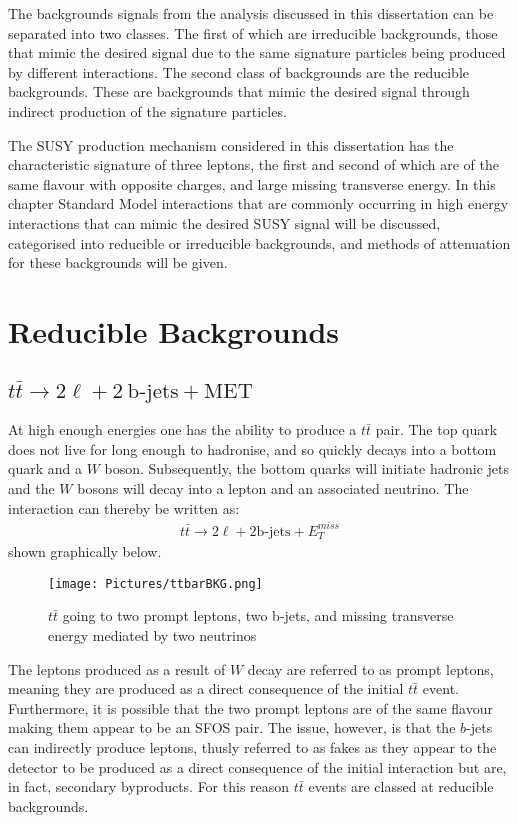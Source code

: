 The backgrounds signals from the analysis discussed in this dissertation can be separated into two classes.
The first of which are irreducible backgrounds, those that mimic the desired signal due to the same signature particles being produced by different interactions.
The second class of backgrounds are the reducible backgrounds.
These are backgrounds that mimic the desired signal through indirect production of the signature particles. 

The SUSY production mechanism considered in this dissertation has the characteristic signature of three leptons, the first and second of which are of the same flavour with opposite charges, and large missing transverse energy.
In this chapter Standard Model interactions that are commonly occurring in high energy interactions that can mimic the desired SUSY signal will be discussed, categorised into reducible or irreducible backgrounds, and methods of attenuation for these backgrounds will be given.

\section{Reducible Backgrounds}
\subsection{$t\bar{t} \rightarrow 2\ell + 2\ \textrm{b-jets} + \textrm{MET}$} \label{subsec:ttbar}
At high enough energies one has the ability to produce a $t\bar{t}$ pair.
The top quark does not live for long enough to hadronise, and so quickly decays into a bottom quark and a $W$ boson.
Subsequently, the bottom quarks will initiate hadronic jets and the $W$ bosons will decay into a lepton and an associated neutrino.
The interaction can thereby be written as:
\begin{align}
t\bar{t} \rightarrow 2\ell  + 2\textrm{b-jets} + E_{T}^{miss}
\end{align}
shown graphically below.
\begin{figure}[htbp] %
   \centering
   \texttt{[image: Pictures/ttbarBKG.png]} 
   \caption{$t\bar{t}$ going to two prompt leptons, two b-jets, and missing transverse energy mediated by two neutrinos}
   \label{fig:example}
\end{figure}

\noindent The leptons produced as a result of $W$ decay are referred to as prompt leptons, meaning they are produced as a direct consequence of the initial $t\bar{t}$ event.
Furthermore, it is possible that the two prompt leptons are of the same flavour making them appear to be an SFOS pair.
The issue, however, is that the $b$-jets can indirectly produce leptons, thusly referred to as fakes as they appear to the detector to be produced as a direct consequence of the initial interaction but are, in fact, secondary byproducts. 
For this reason $t\bar{t}$ events are classed at reducible backgrounds.

